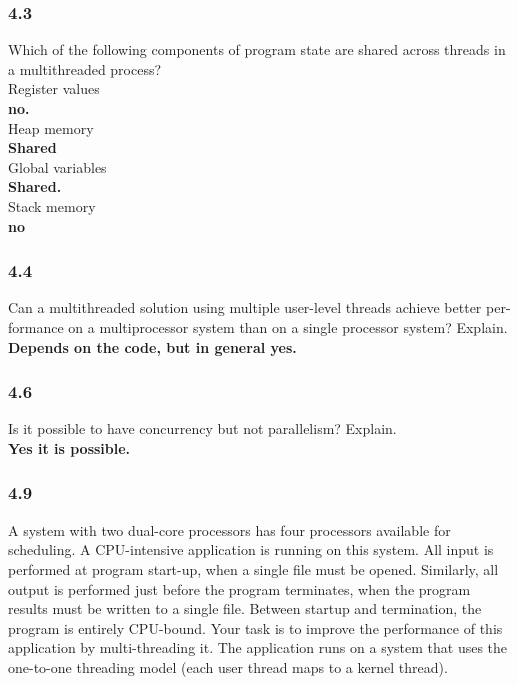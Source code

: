 \documentclass[a4paper,10pt,titlepage]{report}
\begin{document}
\subsubsection{4.3}
Which of the following components of program state are shared across threads in a multithreaded process?\\

Register values\\
\textbf{no.} \\
Heap memory\\
\textbf{Shared }\\
Global variables\\
\textbf{Shared.} \\
Stack memory\\
\textbf{no} \\ \vspace{5mm}
\subsubsection{4.4}
Can a multithreaded solution using multiple user-level threads achieve better per- formance on a multiprocessor system than on a single processor system? Explain.\\
\textbf{Depends on the code, but in general yes.}\\ \vspace{5mm}
\subsubsection{4.6}
Is it possible to have concurrency but not parallelism? Explain.\\
\textbf{Yes it is possible.}\\ \vspace{5mm}

\subsubsection{4.9}
A system with two dual-core processors has four processors available for scheduling. A CPU-intensive application is running on this system. All input is performed at program start-up, when a single file must be opened. Similarly, all output is performed just before the program terminates, when the program results must be written to a single file. Between startup and termination, the program is entirely CPU-bound. Your task is to improve the performance of this application by multi-threading it. The application runs on a system that uses the one-to-one threading model (each user thread maps to a kernel thread).\\
\end{document}
